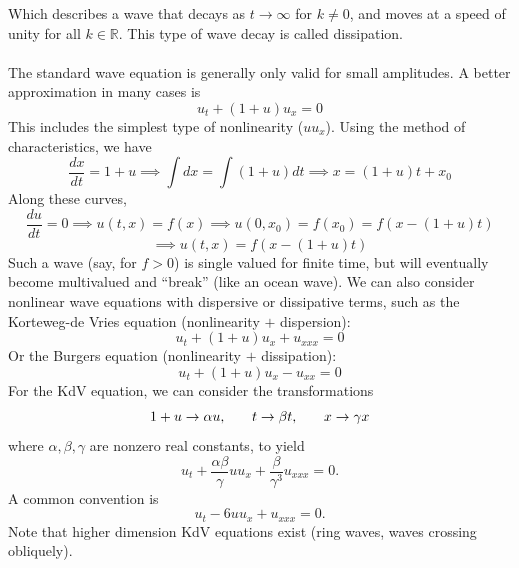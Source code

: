 \documentclass[fleqn, 12pt]{article}
\newcommand{\R}{\mathbb{R}}
\begin{document}
Which describes a wave that decays as $t\to\infty$ for $k\neq0$, and moves at a speed of unity for all $k\in\R$. This type of wave decay is called dissipation.
\\\\
The standard wave equation is generally only valid for small amplitudes. A better approximation in many cases is
\[
u_t+(1+u)u_x=0
\]
This includes the simplest type of nonlinearity ($uu_x$). Using the method of characteristics, we have
\[
\frac{dx}{dt}=1+u\implies\int dx=\int(1+u)dt\implies x=(1+u)t+x_0
\]
Along these curves,
\[
\frac{du}{dt}=0\implies u(t,x)=f(x)\implies u(0,x_0)=f(x_0)=f(x-(1+u)t)
\]
\[
\implies u(t,x)=f(x-(1+u)t)
\]
Such a wave (say, for $f>0$) is single valued for finite time, but will eventually become multivalued and ``break'' (like an ocean wave). We can also consider nonlinear wave equations with dispersive or dissipative terms, such as the Korteweg-de Vries equation (nonlinearity $+$ dispersion):
\[
u_t+(1+u)u_x+u_{xxx}=0
\]
Or the Burgers equation (nonlinearity $+$ dissipation):
\[
u_t+(1+u)u_x-u_{xx}=0
\]
For the KdV equation, we can consider the transformations
\[
1+u\to\alpha u\text{,\quad\quad}t\to\beta t\text{,\quad\quad}x\to\gamma x
\]
where $\alpha,\beta,\gamma$ are nonzero real constants, to yield
\[
u_t+\frac{\alpha\beta}{\gamma}uu_x+\frac{\beta}{\gamma^3}u_{xxx}=0.
\]
A common convention is
\[
u_t-6uu_x+u_{xxx}=0.
\]
Note that higher dimension KdV equations exist (ring waves, waves crossing obliquely).
\end{document}

